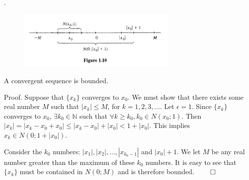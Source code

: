 \documentclass[8pt]{beamer}
\newcommand{\mbb}[1]{\mathbb{#1}}
\newcommand{\abs}[1]{\left\lvert #1 \right\rvert}
\begin{document}
\begin{frame}{.}
    \begin{figure}
        \includegraphics[width=0.7\textwidth]{theorem1.3.3.png}
    \end{figure}

    \begin{theorem} \label{th:5}
        A convergent sequence is bounded.

        \smallskip
        Proof. Suppose that $\{x_k\}$ converges to $x_0$.
        We must show that there exists some real number $M$ such that $\abs{x_k} \leq M$, for $k=1,2,3,\dots$.
        Let $\epsilon=1$.
        Since $\{x_k\}$ converges to $x_0$, $\exists k_0 \in \mbb{N}$ such that $\forall k \geq k_0, k_0 \in N(x_0; 1)$.
        Then $\abs{x_k} = \abs{x_k - x_0 + x_0} \leq \abs{x_k - x_0} + \abs{x_0} < 1 + \abs{x_0}$.
        This implies $x_k \in N(0; 1+\abs{x_0})$.

        Consider the $k_0$ numbers: $\abs{x_1}, \abs{x_2}, \dots, \abs{x_{k_0 - 1}}$ and $\abs{x_0} + 1$.
        We let $M$ be any real number greater than the maximum of these $k_0$ numbers.
        It is easy to see that $\{x_k\}$ must be contained in $N(0;M)$ and is therefore bounded.
        $\qed$
    \end{theorem}
\end{frame}
\end{document}
